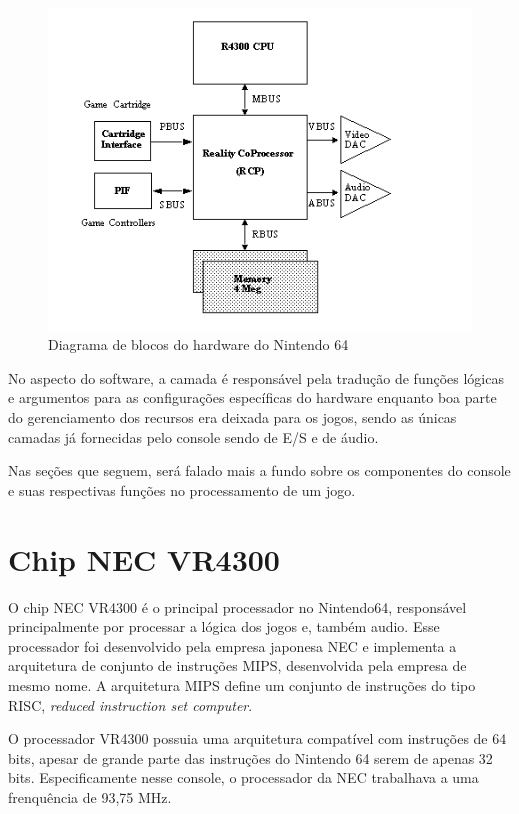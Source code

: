 \documentclass[12pt]{article}
\begin{document}
\begin{figure}[H]
    \label{fig:block-diagram}
    \centering
        \includegraphics[scale=.65]{figures/nintendo64-diagram}
    \caption{Diagrama de blocos do hardware do Nintendo 64}
\end{figure}

No aspecto do software, a camada é responsável pela tradução de
funções lógicas e argumentos para as configurações específicas
do hardware enquanto boa parte do gerenciamento dos recursos
era deixada para os jogos, sendo as únicas camadas já fornecidas
pelo console sendo de E/S e de áudio.

Nas seções que seguem, será falado mais a fundo sobre os componentes do
console e suas respectivas funções no processamento de um jogo.


\section{Chip NEC VR4300}
    O chip NEC VR4300 é o principal processador no Nintendo64,
responsável principalmente por processar a lógica dos jogos e, 
também audio. Esse processador foi desenvolvido pela empresa japonesa
NEC e implementa a arquitetura de conjunto de instruções MIPS, 
desenvolvida pela empresa de mesmo nome. A arquitetura MIPS define um
conjunto de instruções do tipo RISC, \emph{reduced instruction set
computer}.

    O processador VR4300 possuia uma arquitetura compatível com 
instruções de 64 bits, apesar de grande parte das instruções do
Nintendo 64 serem de apenas 32 bits. Especificamente nesse console, o
processador da NEC trabalhava a uma frenquência de 93,75 MHz.
\end{document}

